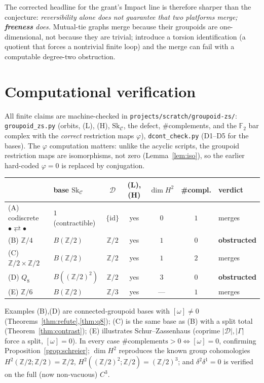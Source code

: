 \documentclass[11pt]{article}
\theoremstyle{definition}
\newcommand{\id}{\mathrm{id}}
\newcommand{\C}{\mathcal{C}}
\newcommand{\D}{\mathcal{D}}
\newcommand{\Sk}{\mathrm{Sk}}
\newcommand{\Z}{\mathbb{Z}}
\begin{document}
\noindent The corrected headline for the grant's Impact line is therefore sharper
than the conjecture: \emph{reversibility alone does not guarantee that two platforms
merge; \textbf{freeness} does.} Mutual-tie graphs merge because their groupoids are
one-dimensional, not because they are trivial; introduce a torsion identification
(a quotient that forces a nontrivial finite loop) and the merge can fail with a
computable degree-two obstruction.

\section{Computational verification}\label{sec:comp}

All finite claims are machine-checked in \texttt{projects/scratch/groupoid-zs/}:
\texttt{groupoid\_zs.py} (orbits, \textnormal{(L)}, \textnormal{(H)}, $\Sk_\C$, the
defect, \#complements, and the $\mathbb F_2$ bar complex with the \emph{correct}
restriction maps $\varphi$), \texttt{dcont\_check.py} (D1--D5 for the bases). The
$\varphi$ computation matters: unlike the acyclic scripts, the groupoid restriction
maps are isomorphisms, not zero (Lemma~\ref{lem:iso}), so the earlier hard-coded
$\varphi=0$ is replaced by conjugation.

\begin{center}
\small
\begin{tabular}{llccccl}
\toprule
 & base $\Sk_\C$ & $\D$ & (L),(H) & $\dim H^2$ & \#compl. & verdict\\
\midrule
(A) codiscrete $\bullet\rightleftarrows\bullet$ & $1$ (contractible) & $\{\id\}$ & yes & $0$ & $1$ & merges\\
(B) $\Z/4$ & $B(\Z/2)$ & $\Z/2$ & yes & $1$ & $0$ & \textbf{obstructed}\\
(C) $\Z/2\times\Z/2$ & $B(\Z/2)$ & $\Z/2$ & yes & $1$ & $2$ & merges\\
(D) $Q_8$ & $B((\Z/2)^2)$ & $\Z/2$ & yes & $3$ & $0$ & \textbf{obstructed}\\
(E) $\Z/6$ & $B(\Z/2)$ & $\Z/3$ & yes & --- & $1$ & merges\\
\bottomrule
\end{tabular}
\end{center}

\noindent Examples (B),(D) are connected-groupoid bases with $[\omega]\neq0$
(Theorems~\ref{thm:refute},\ref{thm:q8}); (C) is the same base as (B) with a split
total (Theorem~\ref{thm:contrast}); (E) illustrates Schur--Zassenhaus (coprime
$|\D|,|\Gamma|$ force a split, $[\omega]=0$). In every case
$\#\text{complements}>0\iff[\omega]=0$, confirming Proposition~\ref{prop:schreier};
$\dim H^2$ reproduces the known group cohomologies $H^2(\Z/2;\Z/2)=\Z/2$,
$H^2((\Z/2)^2;\Z/2)=(\Z/2)^3$; and $\delta^2\delta^1=0$ is verified on the full
(now non-vacuous) $C^3$.
\end{document}
